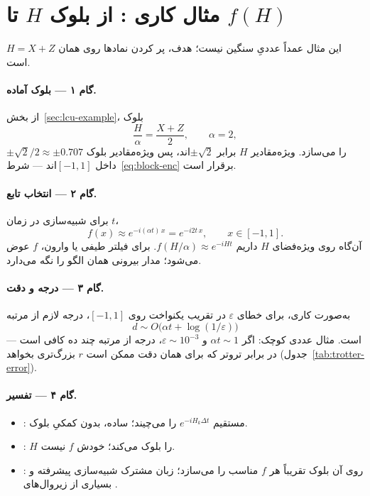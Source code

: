 \section{مثال کاری : از بلوک $H$ تا $f(H)$}
\label{sec:qsp-example}

این مثال عمداً عددیِ سنگین نیست؛ هدف، پر کردن نمادها روی همان $H=X+Z$ است.

\paragraph{گام ۱ --- بلوک آماده.}
از بخش~\ref{sec:lcu-example}،  بلوک
\begin{equation}
	\frac{H}{\alpha}=\frac{X+Z}{2},
	\qquad
	\alpha=2,
\end{equation}
را می‌سازد. ویژه‌مقادیر $H$ برابر $\pm\sqrt{2}$اند، پس ویژه‌مقادیر بلوک $\pm\sqrt{2}/2\approx\pm 0.707$ داخل $[-1,1]$اند --- شرط~\eqref{eq:block-enc} برقرار است.

\paragraph{گام ۲ --- انتخاب تابع.}
برای شبیه‌سازی در زمان $t$،
\begin{equation}
	f(x)\approx e^{-i(\alpha t)\,x}=e^{-i 2t\, x},
	\qquad
	x\in[-1,1].
\end{equation}
آن‌گاه روی ویژه‌فضای $H$ داریم $f(H/\alpha)\approx e^{-iHt}$. برای فیلتر طیفی یا وارون، $f$ عوض می‌شود؛ مدار بیرونی  همان الگو را نگه می‌دارد.

\paragraph{گام ۳ --- درجه و دقت.}
به‌صورت کاری، برای خطای $\varepsilon$ در تقریب یکنواخت روی $[-1,1]$، درجه لازم از مرتبه
\begin{equation}
	d \sim O\bigl(\alpha t + \log(1/\varepsilon)\bigr)
\end{equation}
است. مثال عددی کوچک: اگر $\alpha t \sim 1$ و $\varepsilon\sim 10^{-3}$، درجه از مرتبه چند ده کافی است --- در برابر تروتر که برای همان دقت ممکن است $r$ بزرگ‌تری بخواهد (جدول~\ref{tab:trotter-error}).

\paragraph{گام ۴ --- تفسیر.}
\begin{itemize}
	\item {}: مستقیم $e^{-iH_k\Delta t}$ را می‌چیند؛ ساده، بدون کمکیِ بلوک.
	\item {}: $H$ را بلوک می‌کند؛ خودش $f$ نیست.
	\item {}: روی آن بلوک تقریباً هر $f$ مناسب را می‌سازد؛ زبان مشترک شبیه‌سازی پیشرفته و بسیاری از زیروال‌های .
\end{itemize}

